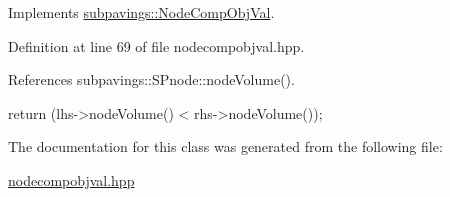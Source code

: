 \-Implements \hyperlink{classsubpavings_1_1NodeCompObjVal_a0c12ddc23446e5be6bb71d024ec40c62}{subpavings\-::\-Node\-Comp\-Obj\-Val}.



\-Definition at line 69 of file nodecompobjval.\-hpp.



\-References subpavings\-::\-S\-Pnode\-::node\-Volume().


\begin{DoxyCode}
        { return (lhs->nodeVolume() < rhs->nodeVolume()); }
\end{DoxyCode}


\-The documentation for this class was generated from the following file\-:\begin{DoxyCompactItemize}
\item 
\hyperlink{nodecompobjval_8hpp}{nodecompobjval.\-hpp}\end{DoxyCompactItemize}
